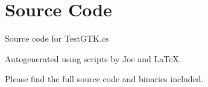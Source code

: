 \documentclass[12pt]{article}
\begin{document}
\maketitle
\pagebreak


\section{Source Code}

Source code for \textsf{TestGTK.cs}


\newpage



\newpage

Autogenerated using scripts by Joe and \LaTeX.

Please find the full source code and binaries included.
\end{document}
